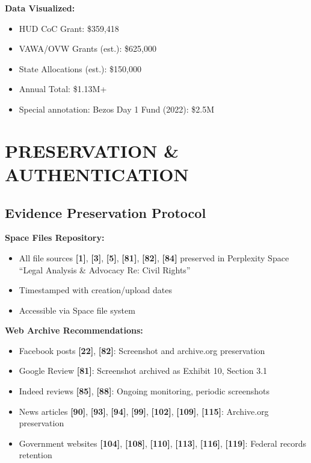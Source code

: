 \documentclass[11pt,letterpaper]{article}
\newcommand{\citeref}[1]{\textbf{\color{NavyBlue}[#1]}}
\begin{document}
\vspace{0.1in}

\textbf{Data Visualized:}
\begin{itemize}[leftmargin=*]
\item HUD CoC Grant: \$359,418
\item VAWA/OVW Grants (est.): \$625,000
\item State Allocations (est.): \$150,000
\item Annual Total: \$1.13M+
\item Special annotation: Bezos Day 1 Fund (2022): \$2.5M
\end{itemize}

\newpage

\section{PRESERVATION \& AUTHENTICATION}

\subsection{Evidence Preservation Protocol}

\textbf{Space Files Repository:}
\begin{itemize}[leftmargin=*]
\item All file sources \citeref{1}, \citeref{3}, \citeref{5}, \citeref{81}, \citeref{82}, \citeref{84} preserved in Perplexity Space ``Legal Analysis \& Advocacy Re: Civil Rights''
\item Timestamped with creation/upload dates
\item Accessible via Space file system
\end{itemize}

\textbf{Web Archive Recommendations:}
\begin{itemize}[leftmargin=*]
\item Facebook posts \citeref{22}, \citeref{82}: Screenshot and archive.org preservation
\item Google Review \citeref{81}: Screenshot archived as Exhibit 10, Section 3.1
\item Indeed reviews \citeref{85}, \citeref{88}: Ongoing monitoring, periodic screenshots
\item News articles \citeref{90}, \citeref{93}, \citeref{94}, \citeref{99}, \citeref{102}, \citeref{109}, \citeref{115}: Archive.org preservation
\item Government websites \citeref{104}, \citeref{108}, \citeref{110}, \citeref{113}, \citeref{116}, \citeref{119}: Federal records retention
\end{itemize}
\end{document}
